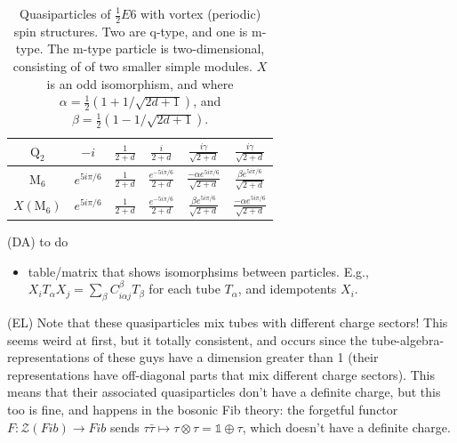 \documentclass[12pt,a4paper]{article}
\newcounter{arrow}
\newcommand{\tp}{\otimes}
\newcommand{\ra}{\rightarrow}
\newcommand{\unit}{\mathds{1}}
\newcommand{\mcz}{\mathcal{Z}}
\newcommand{\dave}[1]{{\color{ao(english)}\footnotesize{(DA) #1}}}
\newcommand{\ethan}[1]{{\color{amethyst}\footnotesize{(EL) #1}}}
\begin{document}
\begin{table}
{{\begin{tabu}{c  c | c c c c }
$\text{Q}_2$&$-i$ &$ \frac{1}{2+d} $& $\frac{i}{2+d}$ & $\frac{i \gamma}{\sqrt{2+d}}$ & $\frac{i \gamma}{\sqrt{2+d}}$ \\ \hline 
$\text{M}_6$&$e^{5i \pi/6}$&$ \frac{1}{2+d} $&$ \frac{e^{-5i\pi/6}}{2+d} $ & $\frac{- \alpha e^{5 i \pi/6}}{\sqrt{2+d}}$ & $\frac{\beta e^{5 i \pi /6}}{\sqrt{2+d}}$ \\ 
$X(\text{M}_6)$&$e^{5i \pi/6}$&$ \frac{1}{2+d} $&$ \frac{e^{-5i\pi/6}}{2+d} $ &  $\frac{\beta e^{5 i \pi /6}}{\sqrt{2+d}}$  &$\frac{- \alpha e^{5 i \pi/6}}{\sqrt{2+d}}$ 
\end{tabu}
   }
\caption{Quasiparticles of $\frac{1}{2} E6$ with vortex (periodic) spin structures. Two are q-type, and one is m-type. The m-type particle is two-dimensional, consisting of of two smaller simple modules.  $X$ is an odd isomorphism, and where %
$\alpha = \frac{1}{2} \left( 1+ 1/\sqrt{2d+1} \right)$, and $\beta = \frac{1}{2} \left( 1- 1/\sqrt{2d+1} \right)$.}}
\end{table}
\dave{to do}
\begin{itemize}
\item table/matrix that shows isomorphsims between particles. E.g., $X_i T_\alpha X_j = \sum_\beta C_{i\alpha j}^{ \beta} T_\beta$ for each tube $T_{\alpha}$, and idempotents $X_i$.
\end{itemize}


\ethan{Note that these quasiparticles mix tubes with different charge sectors! This seems weird at first, but it totally consistent, and occurs since the tube-algebra-representations of these guys have a dimension greater than 1 (their representations have off-diagonal parts that mix different charge sectors). This means that their associated quasiparticles don't have a definite charge, but this too is fine, and happens in the bosonic Fib theory: the forgetful functor $F:\mcz(Fib) \ra Fib$ sends $\tau\bar\tau \mapsto \tau\tp\tau = \unit\oplus\tau$, which doesn't have a definite charge.}
\end{document}
